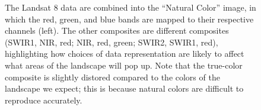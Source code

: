 \documentclass[
  letterpaper,
]{scrbook}
\begin{document}
\begin{figure}[pbt]


\caption{\label{fig-kmeans-composites}The Landsat 8 data are combined
into the ``Natural Color'' image, in which the red, green, and blue
bands are mapped to their respective channels (left). The other
composites are different composites (SWIR1, NIR, red; NIR, red, green;
SWIR2, SWIR1, red), highlighting how choices of data representation are
likely to affect what areas of the landscape will pop up. Note that the
true-color composite is slightly distored compared to the colors of the
landscape we expect; this is because natural colors are difficult to
reproduce accurately.}

\end{figure}%
\end{document}
